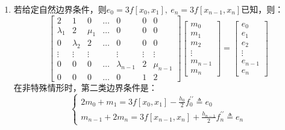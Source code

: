 \begin{enumerate}
\begin{enumerate}
	\item 若给定自然边界条件，则$e_0=3f[x_0,x_1],\ e_n=3f[x_{n-1},x_n]$已知，则：
		\begin{equation}
			\begin{bmatrix}
			2 &1 &0 &\dots &0 &0 &0 \\
			\lambda_1 &2 &\mu_1 &\dots &0 &0 &0 \\
			0 &\lambda_2 &2 &\dots &0 &0 &0 \\
			\vdots &\vdots &\vdots &\  &\vdots &\vdots &\vdots \\
			0 &0 &0 &\dots &\lambda_{n-1} &2 &\mu_{n-1} \\
			0 &0 &0 &\dots &0 &1 &2
			\end{bmatrix}
			\begin{bmatrix}
			m_0\\ m_1\\ m_2\\ \vdots \\ m_{n-1}\\ m_{n}
			\end{bmatrix}
			=
			\begin{bmatrix}
			e_0\\ e_1\\ e_2\\ \vdots \\ e_{n-1}\\ e_{n}
			\end{bmatrix}
		\end{equation}
		 在非特殊情形时，第二类边界条件是：
		\begin{equation}
			\begin{cases}
			2m_0 + m_1 = 3f[x_0,x_1] - \frac{h_0}{2}f_0^{\prime \prime} \triangleq e_0 \\
			m_{n-1} + 2m_n = 3f[x_{n-1},x_n] + \frac{h_{n-1}}{2}f_n^{\prime \prime} \triangleq e_n
			\end{cases}
		\end{equation}


\end{enumerate}
\end{enumerate}
